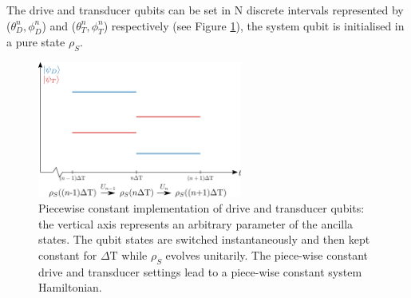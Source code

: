 The drive and transducer qubits can be set in N discrete intervals represented by ($\theta_D^n, \phi_D^n$) and ($\theta_T^n, \phi_T^n$) respectively (see Figure \ref{pwc}), the system qubit is initialised in a pure state $\rho_S$.

\begin{figure}[h]
	\centering
	\includegraphics[width=0.6\textwidth]{img/pwc2}
	\caption{Piecewise constant implementation of drive and transducer qubits: the vertical axis represents an arbitrary parameter of the ancilla states. The qubit states are switched instantaneously and then kept constant for $\Delta \mathrm{T}$ while $\rho_S$ evolves unitarily. The piece-wise constant drive and transducer settings lead to a piece-wise constant system Hamiltonian.}
	\label{pwc}
\end{figure}

